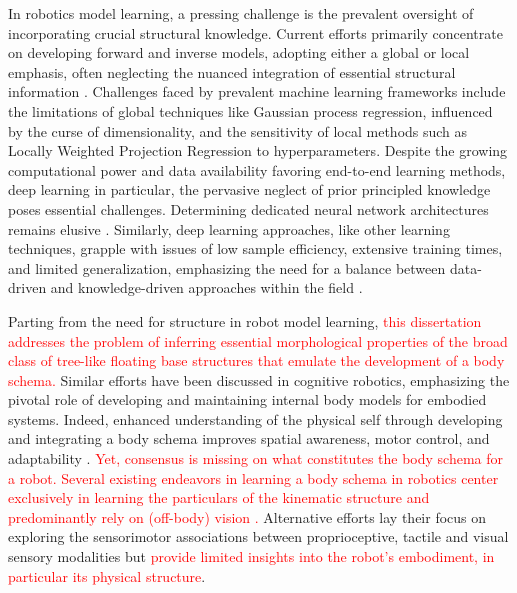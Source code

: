 \documentclass[12pt, a4paper]{article}
\newcommand{\redtext}[1]{\textcolor{red}{#1}}
\begin{document}
In robotics model learning, a pressing challenge is the prevalent oversight of incorporating crucial structural knowledge. Current efforts primarily concentrate on developing forward and inverse models, adopting either a global or local emphasis, often neglecting the nuanced integration of essential structural information \cite{NguyenTuong2011Modellearningrobot}. Challenges faced by prevalent machine learning frameworks include the limitations of global techniques like Gaussian process regression, influenced by the curse of dimensionality, and the sensitivity of local methods such as Locally Weighted Projection Regression to hyperparameters. Despite the growing computational power and data availability favoring end-to-end learning methods, deep learning in particular, the pervasive neglect of prior principled knowledge poses essential challenges. Determining dedicated neural network architectures remains elusive \cite{Baker2017Designingneuralnetwork,Elsken2019Neuralarchitecturesearch}. Similarly, deep learning approaches, like other learning techniques, grapple with issues of low sample efficiency, extensive training times, and limited generalization, emphasizing the need for a balance between data-driven and knowledge-driven approaches within the field \cite{Pierson2017Deeplearningrobotics,Suenderhauf2018limitspotentialsdeep}.

Parting from the need for structure in robot model learning, \redtext{this dissertation addresses the problem of inferring essential morphological properties of the broad class of tree-like floating base structures that emulate the development of a body schema.} Similar efforts have been discussed in cognitive robotics, emphasizing the pivotal role of developing and maintaining internal body models for embodied systems. Indeed, enhanced understanding of the physical self through developing and integrating a body schema improves spatial awareness, motor control, and adaptability \cite{Nguyen2021Sensorimotorrepresentationlearning,Hoffmann2010Bodyschemarobotics}. \redtext{Yet, consensus is missing on what constitutes the body schema for a robot. Several existing endeavors in learning a body schema in robotics center exclusively in learning the particulars of the kinematic structure and predominantly rely on (off-body) vision \cite{Hersch2008Onlinelearningbody,MartinezCantin2010Bodyschemaacquisition,Hart2011roboticmodelecological,Lipson2019Taskagnosticself,Chen2022Fullybodyvisual,Sturm2009Bodyschemalearning}.} Alternative efforts lay their focus on exploring the sensorimotor associations between proprioceptive, tactile and visual sensory modalities \cite{Fuke2007BodyImageConstructed,Malinovska2022connectionistmodelassociating,Nguyen2019Reachingdevelopmentvisuo,Pugach2019BrainInspiredCoding,Lanillos2016Yieldingselfperception} but \redtext{provide limited insights into the robot's embodiment, in particular its physical structure}.
\end{document}
